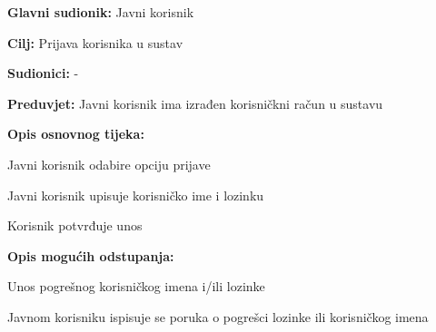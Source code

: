 					\noindent {}
					\begin{packed_item}
						
						\item \textbf{Glavni sudionik: }Javni korisnik
						\item  \textbf{Cilj:} Prijava korisnika u sustav 
						\item  \textbf{Sudionici:} -
						\item  \textbf{Preduvjet:} Javni korisnik ima izrađen korisničkni račun u sustavu
						\item  \textbf{Opis osnovnog tijeka:}
						
						\item[] \begin{packed_enum}
							
							\item Javni korisnik odabire opciju prijave
							\item Javni korisnik upisuje korisničko ime i lozinku
							\item Korisnik potvrđuje unos
						\end{packed_enum}
						
						\item  \textbf{Opis mogućih odstupanja:}
						
						\item[] \begin{packed_item}
							
							\item[2.a] Unos pogrešnog korisničkog imena i/ili lozinke
							\item[] \begin{packed_enum}
								
								\item Javnom korisniku ispisuje se poruka o pogrešci lozinke ili korisničkog imena
								
							\end{packed_enum}
							
						\end{packed_item}
					\end{packed_item}
				
